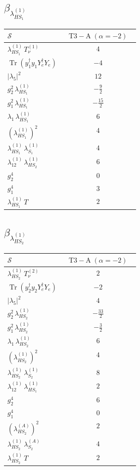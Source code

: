 \documentclass[9pt]{article}
\begin{document}
\subsection*{$ \beta_{\lambda_{HS_1}^{(1)}} $}
\begin{longtable}{@{}p{0.31\linewidth}c@{}}
\toprule
$\mathcal{S}$ & $ \mathrm{T3-A}\;(\alpha=-2) $ \\
\midrule
$ \lambda_{HS_1}^{(1)}\,T_{\nu}^{(1)} $ & $ 4 $ \\
$ \operatorname{Tr}(y_1^\dagger y_1Y_e^\dagger Y_e) $ & $ -4 $ \\
$ |\lambda_5|^2 $ & $ 12 $ \\
$ g_2^2\,\lambda_{HS_1}^{(1)} $ & $ - \frac{9}{2} $ \\
$ g_1^2\,\lambda_{HS_1}^{(1)} $ & $ - \frac{15}{2} $ \\
$ \lambda_1\,\lambda_{HS_1}^{(1)} $ & $ 6 $ \\
$ \left(\lambda_{HS_1}^{(1)}\right)^2 $ & $ 4 $ \\
$ \lambda_{HS_1}^{(1)}\,\lambda_{S_1}^{(1)} $ & $ 4 $ \\
$ \lambda_{12}^{(1)}\,\lambda_{HS_2}^{(1)} $ & $ 6 $ \\
$ g_2^4 $ & $ 0 $ \\
$ g_1^4 $ & $ 3 $ \\
$ \lambda_{HS_1}^{(1)}\,T $ & $ 2 $ \\
\bottomrule
\end{longtable}
\subsection*{$ \beta_{\lambda_{HS_2}^{(1)}} $}
\begin{longtable}{@{}p{0.31\linewidth}c@{}}
\toprule
$\mathcal{S}$ & $ \mathrm{T3-A}\;(\alpha=-2) $ \\
\midrule
$ \lambda_{HS_2}^{(1)}\,T_{\nu}^{(2)} $ & $ 2 $ \\
$ \operatorname{Tr}(y_2^\dagger y_2Y_e^\dagger Y_e) $ & $ -2 $ \\
$ |\lambda_5|^2 $ & $ 4 $ \\
$ g_2^2\,\lambda_{HS_2}^{(1)} $ & $ - \frac{33}{2} $ \\
$ g_1^2\,\lambda_{HS_2}^{(1)} $ & $ - \frac{3}{2} $ \\
$ \lambda_1\,\lambda_{HS_2}^{(1)} $ & $ 6 $ \\
$ \left(\lambda_{HS_2}^{(1)}\right)^2 $ & $ 4 $ \\
$ \lambda_{HS_2}^{(1)}\,\lambda_{S_2}^{(1)} $ & $ 8 $ \\
$ \lambda_{12}^{(1)}\,\lambda_{HS_1}^{(1)} $ & $ 2 $ \\
$ g_2^4 $ & $ 6 $ \\
$ g_1^4 $ & $ 0 $ \\
$ \left(\lambda_{HS_2}^{(A)}\right)^2 $ & $ 2 $ \\
$ \lambda_{HS_2}^{(1)}\,\lambda_{S_2}^{(A)} $ & $ 4 $ \\
$ \lambda_{HS_2}^{(1)}\,T $ & $ 2 $ \\
\bottomrule
\end{longtable}
\end{document}
